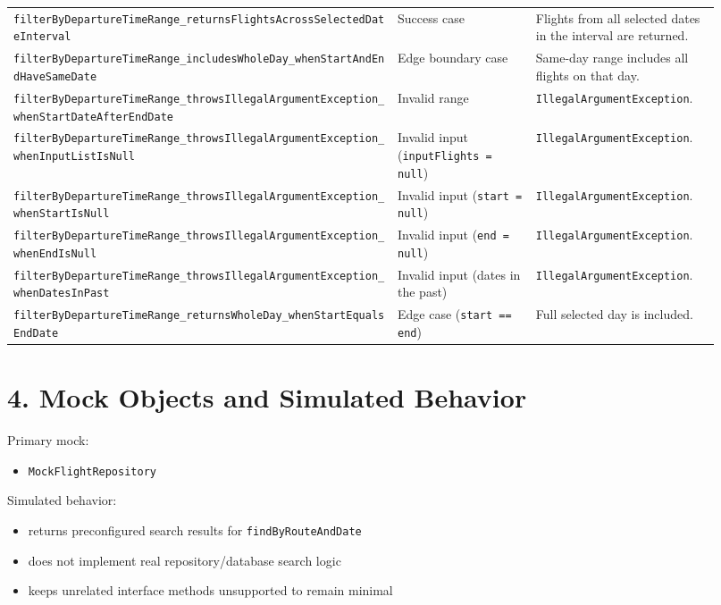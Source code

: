 \documentclass[11pt,a4paper]{article}
\begin{document}
\begin{landscape}
\begin{longtable}{>{\RaggedRight\arraybackslash\small}p{0.50\linewidth}
                  >{\RaggedRight\arraybackslash}p{0.18\linewidth}
                  >{\RaggedRight\arraybackslash}p{0.24\linewidth}}
\nolinkurl{filterByDepartureTimeRange_returnsFlightsAcrossSelectedDateInterval}
& Success case
& Flights from all selected dates in the interval are returned. \\

\nolinkurl{filterByDepartureTimeRange_includesWholeDay_whenStartAndEndHaveSameDate}
& Edge boundary case
& Same-day range includes all flights on that day. \\

\nolinkurl{filterByDepartureTimeRange_throwsIllegalArgumentException_whenStartDateAfterEndDate}
& Invalid range
& \texttt{IllegalArgumentException}. \\

\nolinkurl{filterByDepartureTimeRange_throwsIllegalArgumentException_whenInputListIsNull}
& Invalid input (\texttt{inputFlights = null})
& \texttt{IllegalArgumentException}. \\

\nolinkurl{filterByDepartureTimeRange_throwsIllegalArgumentException_whenStartIsNull}
& Invalid input (\texttt{start = null})
& \texttt{IllegalArgumentException}. \\

\nolinkurl{filterByDepartureTimeRange_throwsIllegalArgumentException_whenEndIsNull}
& Invalid input (\texttt{end = null})
& \texttt{IllegalArgumentException}. \\

\nolinkurl{filterByDepartureTimeRange_throwsIllegalArgumentException_whenDatesInPast}
& Invalid input (dates in the past)
& \texttt{IllegalArgumentException}. \\

\nolinkurl{filterByDepartureTimeRange_returnsWholeDay_whenStartEqualsEndDate}
& Edge case (\texttt{start == end})
& Full selected day is included. \\

\end{longtable}
\end{landscape}

\section*{4. Mock Objects and Simulated Behavior}
Primary mock:
\begin{itemize}
    \item \texttt{MockFlightRepository}
\end{itemize}

Simulated behavior:
\begin{itemize}
    \item returns preconfigured search results for \texttt{findByRouteAndDate}
    \item does not implement real repository/database search logic
    \item keeps unrelated interface methods unsupported to remain minimal
\end{itemize}
\end{document}
